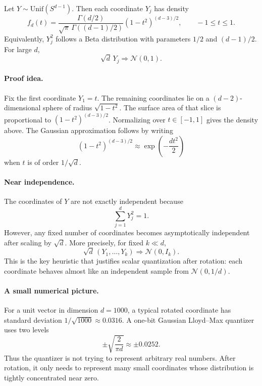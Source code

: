 \begin{lemma}
\label{lem:tq-sphere-coordinate}
Let $Y\sim\mathrm{Unif}(S^{d-1})$.
Then each coordinate $Y_j$ has density
\begin{equation}
    f_d(t)
    =
    \frac{\Gamma(d/2)}{\sqrt\pi\,\Gamma((d-1)/2)}
    (1-t^2)^{(d-3)/2},
    \qquad -1\le t\le 1.
\end{equation}
Equivalently, $Y_j^2$ follows a Beta distribution with parameters $1/2$ and $(d-1)/2$.
For large $d$,
\begin{equation}
    \sqrt d\,Y_j \Rightarrow \mathcal N(0,1).
\end{equation}
\end{lemma}

\paragraph{Proof idea.}
Fix the first coordinate $Y_1=t$.
The remaining coordinates lie on a $(d-2)$-dimensional sphere of radius $\sqrt{1-t^2}$.
The surface area of that slice is proportional to $(1-t^2)^{(d-3)/2}$.
Normalizing over $t\in[-1,1]$ gives the density above.
The Gaussian approximation follows by writing
\begin{equation}
    (1-t^2)^{(d-3)/2}
    \approx \exp\left(-\frac{d t^2}{2}\right)
\end{equation}
when $t$ is of order $1/\sqrt d$.

\paragraph{Near independence.}
The coordinates of $Y$ are not exactly independent because
\begin{equation}
    \sum_{j=1}^{d}Y_j^2=1.
\end{equation}
However, any fixed number of coordinates becomes asymptotically independent after scaling by $\sqrt d$.
More precisely, for fixed $k\ll d$,
\begin{equation}
    \sqrt d\,(Y_1,\dots,Y_k)
    \Rightarrow
    \mathcal N(0,I_k).
\end{equation}
This is the key heuristic that justifies scalar quantization after rotation: each coordinate behaves almost like an independent sample from $\mathcal N(0,1/d)$.

\paragraph{A small numerical picture.}
For a unit vector in dimension $d=1000$, a typical rotated coordinate has standard deviation $1/\sqrt{1000}\approx 0.0316$.
A one-bit Gaussian Lloyd--Max quantizer uses two levels
\begin{equation}
    \pm \sqrt{\frac{2}{\pi d}}
    \approx \pm 0.0252.
\end{equation}
Thus the quantizer is not trying to represent arbitrary real numbers.
After rotation, it only needs to represent many small coordinates whose distribution is tightly concentrated near zero.

